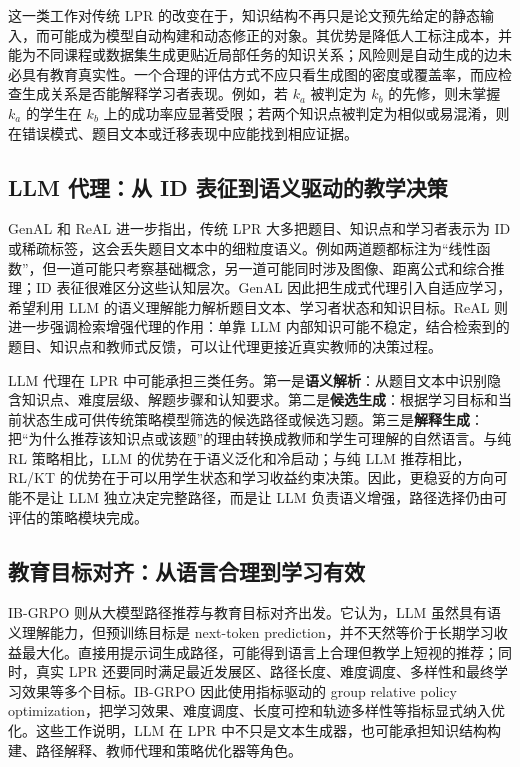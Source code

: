 \documentclass[UTF8,a4paper,zihao=-4]{ctexart}
\begin{document}
这一类工作对传统 LPR 的改变在于，知识结构不再只是论文预先给定的静态输入，而可能成为模型自动构建和动态修正的对象。其优势是降低人工标注成本，并能为不同课程或数据集生成更贴近局部任务的知识关系；风险则是自动生成的边未必具有教育真实性。一个合理的评估方式不应只看生成图的密度或覆盖率，而应检查生成关系是否能解释学习者表现。例如，若 $k_a$ 被判定为 $k_b$ 的先修，则未掌握 $k_a$ 的学生在 $k_b$ 上的成功率应显著受限；若两个知识点被判定为相似或易混淆，则在错误模式、题目文本或迁移表现中应能找到相应证据。

\subsection{LLM 代理：从 ID 表征到语义驱动的教学决策}

GenAL 和 ReAL 进一步指出，传统 LPR 大多把题目、知识点和学习者表示为 ID 或稀疏标签，这会丢失题目文本中的细粒度语义。例如两道题都标注为“线性函数”，但一道可能只考察基础概念，另一道可能同时涉及图像、距离公式和综合推理；ID 表征很难区分这些认知层次。GenAL 因此把生成式代理引入自适应学习，希望利用 LLM 的语义理解能力解析题目文本、学习者状态和知识目标\cite{Lv2025GenAL}。ReAL 则进一步强调检索增强代理的作用：单靠 LLM 内部知识可能不稳定，结合检索到的题目、知识点和教师式反馈，可以让代理更接近真实教师的决策过程\cite{Lv2025ReAL}。

LLM 代理在 LPR 中可能承担三类任务。第一是\textbf{语义解析}：从题目文本中识别隐含知识点、难度层级、解题步骤和认知要求。第二是\textbf{候选生成}：根据学习目标和当前状态生成可供传统策略模型筛选的候选路径或候选习题。第三是\textbf{解释生成}：把“为什么推荐该知识点或该题”的理由转换成教师和学生可理解的自然语言。与纯 RL 策略相比，LLM 的优势在于语义泛化和冷启动；与纯 LLM 推荐相比，RL/KT 的优势在于可以用学生状态和学习收益约束决策。因此，更稳妥的方向可能不是让 LLM 独立决定完整路径，而是让 LLM 负责语义增强，路径选择仍由可评估的策略模块完成。

\subsection{教育目标对齐：从语言合理到学习有效}

IB-GRPO 则从大模型路径推荐与教育目标对齐出发。它认为，LLM 虽然具有语义理解能力，但预训练目标是 next-token prediction，并不天然等价于长期学习收益最大化。直接用提示词生成路径，可能得到语言上合理但教学上短视的推荐；同时，真实 LPR 还要同时满足最近发展区、路径长度、难度调度、多样性和最终学习效果等多个目标。IB-GRPO 因此使用指标驱动的 group relative policy optimization，把学习效果、难度调度、长度可控和轨迹多样性等指标显式纳入优化\cite{Wang2026IBGRPO}。这些工作说明，LLM 在 LPR 中不只是文本生成器，也可能承担知识结构构建、路径解释、教师代理和策略优化器等角色。
\end{document}
